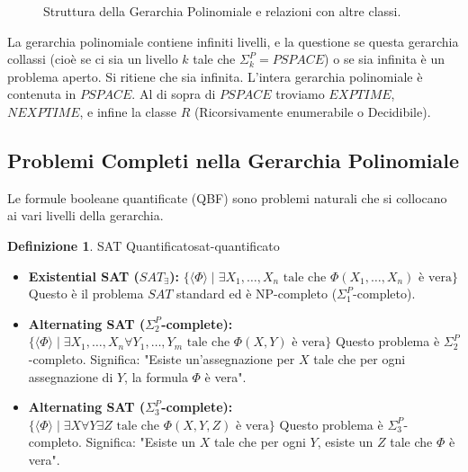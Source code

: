 \documentclass[a4paper]{article}
\theoremstyle{definition} %
\newtheorem{definition}{Definizione}
\begin{document}
\begin{figure}[h]
    \caption{Struttura della Gerarchia Polinomiale e relazioni con altre classi.}
    \label{fig:polynomial_hierarchy}
\end{figure}

La gerarchia polinomiale contiene infiniti livelli, e la questione se questa gerarchia collassi (cioè se ci sia un livello $k$ tale che $\Sigma_k^P = PSPACE$) o se sia infinita è un problema aperto. Si ritiene che sia infinita. L'intera gerarchia polinomiale è contenuta in $PSPACE$. Al di sopra di $PSPACE$ troviamo $EXPTIME$, $NEXPTIME$, e infine la classe $R$ (Ricorsivamente enumerabile o Decidibile).

\subsection{Problemi Completi nella Gerarchia Polinomiale}
Le formule booleane quantificate (QBF) sono problemi naturali che si collocano ai vari livelli della gerarchia.

\begin{definition}{SAT Quantificato}{sat-quantificato}
\begin{itemize}
    \item \textbf{Existential SAT ($SAT_{\exists}$):}
    $\{ \langle \Phi \rangle \mid \exists X_1, \dots, X_n \text{ tale che } \Phi(X_1, \dots, X_n) \text{ è vera} \}$
    Questo è il problema $SAT$ standard ed è NP-completo ($\Sigma_1^P$-completo).
    \item \textbf{Alternating SAT ($\Sigma_2^P$-complete):}
    $\{ \langle \Phi \rangle \mid \exists X_1, \dots, X_n \forall Y_1, \dots, Y_m \text{ tale che } \Phi(X, Y) \text{ è vera} \}$
    Questo problema è $\Sigma_2^P$-completo. Significa: "Esiste un'assegnazione per $X$ tale che per ogni assegnazione di $Y$, la formula $\Phi$ è vera".
    \item \textbf{Alternating SAT ($\Sigma_3^P$-complete):}
    $\{ \langle \Phi \rangle \mid \exists X \forall Y \exists Z \text{ tale che } \Phi(X, Y, Z) \text{ è vera} \}$
    Questo problema è $\Sigma_3^P$-completo. Significa: "Esiste un $X$ tale che per ogni $Y$, esiste un $Z$ tale che $\Phi$ è vera".
\end{itemize}
\end{definition}
\end{document}
